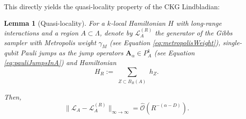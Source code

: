 \documentclass[11pt]{article}
\numberwithin{equation}{section}
\numberwithin{figure}{section}
\numberwithin{table}{section}
\theoremstyle{definition}
\theoremstyle{plain}
\newtheorem{lem}[thm]{Lemma}
\theoremstyle{remark}
\newcommand{\vA}{\bm{A}}
\newcommand{\La}{\Lambda}
\newcommand{\summ}[1]{\sum\limits_{\substack{ #1 }}}
\begin{document}
This directly yields the quasi-locality property of the CKG Lindbladian:
\medskip
\begin{lem}[Quasi-locality]\label{lem:quasiLocality}
For a $k$-local Hamiltonian $H$ with long-range interactions and a region $A\subset \La$, denote by 
$\mathcal{L}_A^{(R)}$ the generator of the Gibbs sampler with 
Metropolis weight $\gamma_M$ (see Equation \ref{eq:metropolisWeight}), single-qubit Pauli jumps as the jump operators $\vA_\alpha \in P_A^1$ (see Equation \eqref{eq:pauliJumpsInA}) and Hamiltonian 
\begin{equation}
    H_R:=\summ{Z\subset B_R(A)}h_Z.
\end{equation}

Then,
\begin{equation}
    \|\mathcal L_A - \mathcal L_A^{(R)}\|_{\infty\to\infty} = \hat{\mathcal{O}}(R^{-(\alpha-D)}).
\end{equation}
\end{lem}
\end{document}

